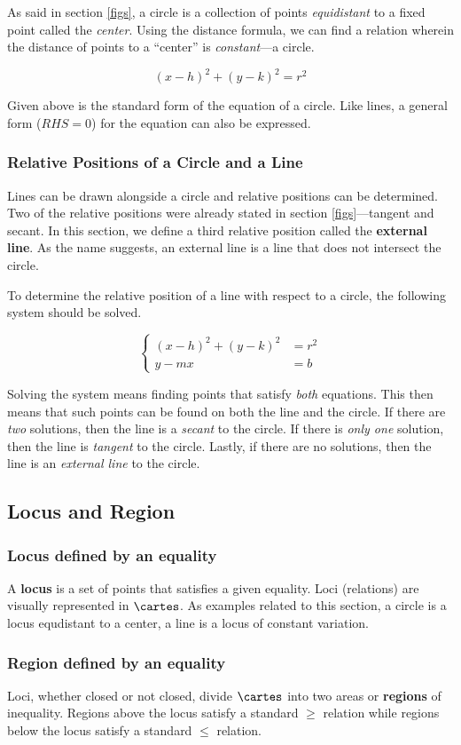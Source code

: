 As said in section \ref{figs}, a circle is a collection of points \emph{equidistant} to a fixed point called the \emph{center}.
Using the distance formula, we can find a relation wherein the distance of points to a ``center'' is \emph{constant}---a circle.

$$(x-h)^2 + (y-k)^2 = r^2$$

Given above is the standard form of the equation of a circle.
Like lines, a general form ($RHS = 0$) for the equation can also be expressed.

\subsubsection{Relative Positions of a Circle and a Line}

Lines can be drawn alongside a circle and relative positions can be determined.
Two of the relative positions were already stated in section \ref{figs}---tangent and secant.
In this section, we define a third relative position called the \textbf{external line}.
As the name suggests, an external line is a line that does not intersect the circle.

To determine the relative position of a line with respect to a circle, the following system should be solved.

$$\begin{cases}
  (x-h)^2 + (y-k)^2 &= r^2 \\
  y - mx &= b
\end{cases}$$

Solving the system means finding points that satisfy \emph{both} equations.
This then means that such points can be found on both the line and the circle.
If there are \emph{two} solutions, then the line is a \emph{secant} to the circle.
If there is \emph{only one} solution, then the line is \emph{tangent} to the circle.
Lastly, if there are no solutions, then the line is an \emph{external line} to the circle.

\subsection{Locus and Region}

\subsubsection{Locus defined by an equality}

A \textbf{locus} is a set of points that satisfies a given equality.
Loci (relations) are visually represented in $\cartes$.
As examples related to this section, a circle is a locus equdistant to a center, a line is a locus of constant variation.

\subsubsection{Region defined by an equality}

Loci, whether closed or not closed, divide $\cartes$ into two areas or \textbf{regions} of inequality.
Regions above the locus satisfy a standard $\geq$ relation while regions below the locus satisfy a standard $\leq$ relation.
